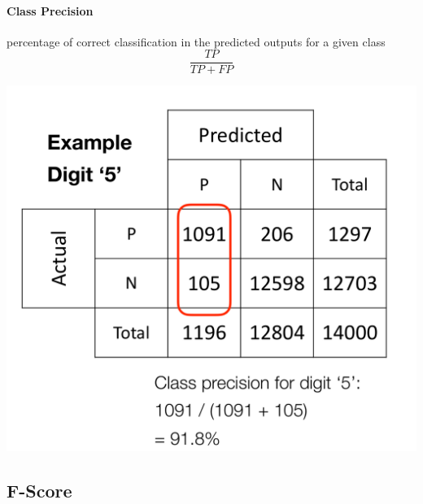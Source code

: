 \documentclass[11pt]{article}
\begin{document}
\begin{minipage}{0.5\textwidth}
	\paragraph{Class Precision} percentage of correct classification in the predicted outputs for a given class
	\begin{equation*}
	\frac{TP}{TP+FP}
	\end{equation*}
\end{minipage}
\begin{minipage}{0.5\textwidth}
	\centering
	\includegraphics[width=0.8\linewidth,keepaspectratio]{class_precision}
\end{minipage}

\subsection{F-Score}
\end{document}
